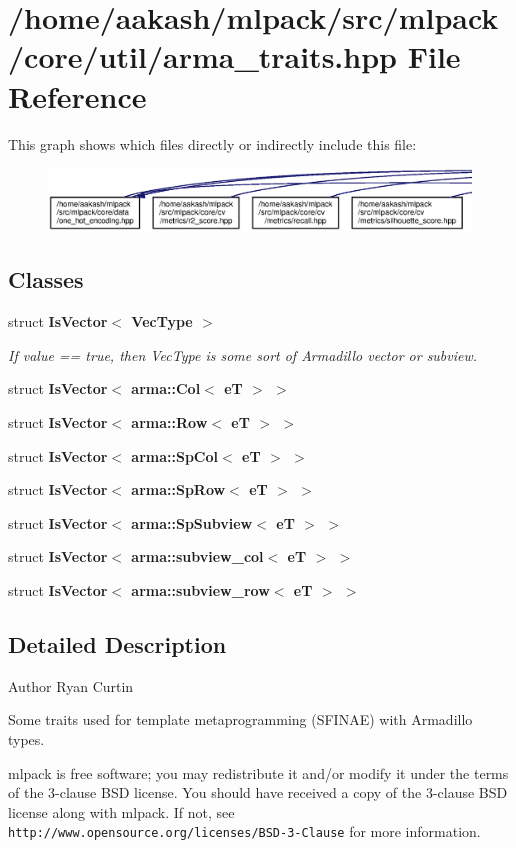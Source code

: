 \section{/home/aakash/mlpack/src/mlpack/core/util/arma\+\_\+traits.hpp File Reference}
\label{arma__traits_8hpp}
This graph shows which files directly or indirectly include this file\+:
\nopagebreak
\begin{figure}[H]
\begin{center}
\leavevmode
\includegraphics[width=350pt]{arma__traits_8hpp__dep__incl}
\end{center}
\end{figure}
\subsection*{Classes}
\begin{DoxyCompactItemize}
\item 
struct \textbf{ Is\+Vector$<$ Vec\+Type $>$}
\begin{DoxyCompactList}\small\item\em If value == true, then Vec\+Type is some sort of Armadillo vector or subview. \end{DoxyCompactList}\item 
struct \textbf{ Is\+Vector$<$ arma\+::\+Col$<$ e\+T $>$ $>$}
\item 
struct \textbf{ Is\+Vector$<$ arma\+::\+Row$<$ e\+T $>$ $>$}
\item 
struct \textbf{ Is\+Vector$<$ arma\+::\+Sp\+Col$<$ e\+T $>$ $>$}
\item 
struct \textbf{ Is\+Vector$<$ arma\+::\+Sp\+Row$<$ e\+T $>$ $>$}
\item 
struct \textbf{ Is\+Vector$<$ arma\+::\+Sp\+Subview$<$ e\+T $>$ $>$}
\item 
struct \textbf{ Is\+Vector$<$ arma\+::subview\+\_\+col$<$ e\+T $>$ $>$}
\item 
struct \textbf{ Is\+Vector$<$ arma\+::subview\+\_\+row$<$ e\+T $>$ $>$}
\end{DoxyCompactItemize}


\subsection{Detailed Description}
\begin{DoxyAuthor}{Author}
Ryan Curtin
\end{DoxyAuthor}
Some traits used for template metaprogramming (S\+F\+I\+N\+AE) with Armadillo types.

mlpack is free software; you may redistribute it and/or modify it under the terms of the 3-\/clause B\+SD license. You should have received a copy of the 3-\/clause B\+SD license along with mlpack. If not, see {\tt http\+://www.\+opensource.\+org/licenses/\+B\+S\+D-\/3-\/\+Clause} for more information. 